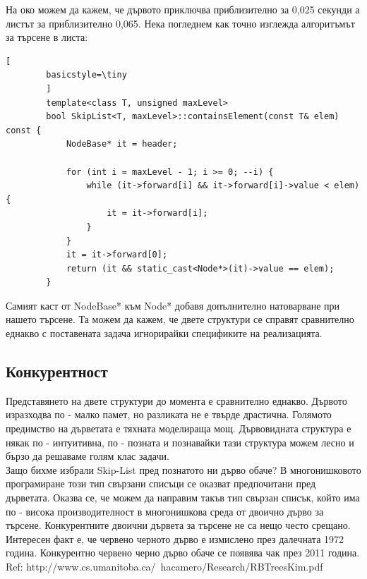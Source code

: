 \documentclass[a4paper,12pt,fleqn]{article}
\begin{document}
	На око можем да кажем, че дървото приключва приблизително за 0,025 секунди а листът за приблизително 0,065. Нека погледнем как точно изглежда алгоритъмът за търсене в листа:\\
	\begin{lstlisting}[
		basicstyle=\tiny
		]
		template<class T, unsigned maxLevel>
		bool SkipList<T, maxLevel>::containsElement(const T& elem) const {
			NodeBase* it = header;
			
			for (int i = maxLevel - 1; i >= 0; --i) {
				while (it->forward[i] && it->forward[i]->value < elem) {
					it = it->forward[i];
				}
			}
			it = it->forward[0];
			return (it && static_cast<Node*>(it)->value == elem);
		}
	\end{lstlisting}
Самият каст от NodeBase* към Node* добавя допълнително натоварване при нашето търсене. Та можем да кажем, че двете структури се справят сравнително еднакво с поставената задача игнорирайки спецификите на реализацията.

\subsection{Конкурентност}
Представянето на двете структури до момента е сравнително еднакво. Дървото изразходва по - малко памет, но разликата не е твърде драстична. Голямото предимство на дърветата е тяхната моделираща мощ. Дървовидната структура е някак по - интуитивна, по - позната и познавайки тази структура можем лесно и бързо да решаваме голям клас задачи.\\
Защо бихме избрали Skip-List пред познатото ни дърво обаче? В многонишковото програмиране този тип свързани списъци се оказват предпочитани пред дърветата.
Оказва се, че можем да направим такъв тип свързан списък, който има по - висока производителност в многонишкова среда от двоично дърво за търсене. Конкурентните двоични дървета за търсене не са нещо често срещано. Интересен факт е, че червено черното дърво е измислено през далечната 1972 година. Конкурентно червено черно дърво обаче се появява чак през 2011 година.\\
Ref: http://www.cs.umanitoba.ca/~hacamero/Research/RBTreesKim.pdf\\
\end{document}

